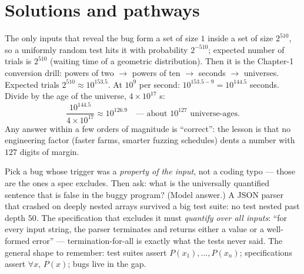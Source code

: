 

\section*{Solutions and pathways}
\solutionsintro

\pathway The only inputs that reveal the bug form a set of size $1$ inside
a set of size $2^{510}$, so a uniformly random test hits it with
probability $2^{-510}$; expected number of trials is $2^{510}$ (waiting
time of a geometric distribution). Then it is the Chapter-1 conversion
drill: powers of two $\to$ powers of ten $\to$ seconds $\to$ universes.
\answer Expected trials $2^{510} \approx 10^{153.5}$. At $10^9$ per second:
$10^{153.5 - 9} = 10^{144.5}$ seconds. Divide by the age of the universe,
$4 \times 10^{17}$ s:
\[
\frac{10^{144.5}}{4 \times 10^{17}} \approx 10^{126.9}
\quad\text{--- about } 10^{127} \text{ universe-ages.}
\]
Any answer within a few orders of magnitude is ``correct'': the lesson is
that no engineering factor (faster farms, smarter fuzzing schedules) dents
a number with $127$ digits of margin.

\pathway Pick a bug whose trigger was a \emph{property of the input}, not a
coding typo --- those are the ones a spec excludes. Then ask: what is the
universally quantified sentence that is false in the buggy program?
\answer (Model answer.) A JSON parser that crashed on deeply nested arrays
survived a big test suite: no test nested past depth $50$. The
specification that excludes it must \emph{quantify over all inputs}:
``for every input string, the parser terminates and returns either a value
or a well-formed error'' --- termination-for-all is exactly what the tests
never said. The general shape to remember: test suites assert
$P(x_1), \dots, P(x_n)$; specifications assert $\forall x,\, P(x)$; bugs
live in the gap.

